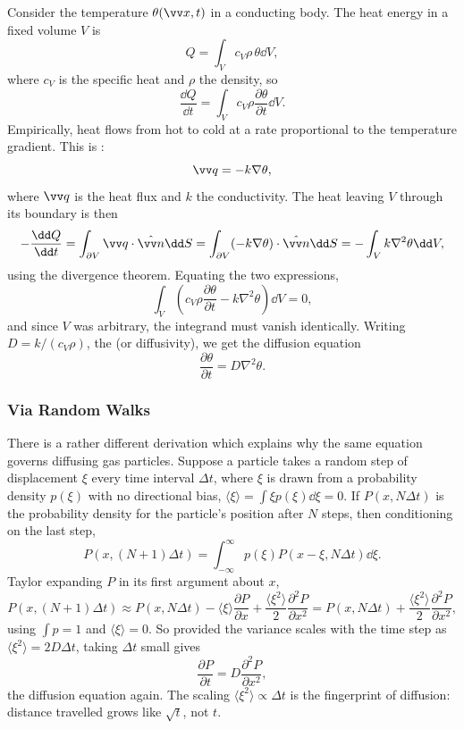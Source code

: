 Consider the temperature $\theta(\vv x, t)$ in a conducting body. The heat energy in a fixed volume $V$ is
$$
Q = \int_V c_V \rho \, \theta \dd V,
$$
where $c_V$ is the specific heat and $\rho$ the density, so
$$
\frac{\dd Q}{\dd t} = \int_V c_V \rho \frac{\partial \theta}{\partial t} \dd V.
$$
Empirically, heat flows from hot to cold at a rate proportional to the temperature gradient. This is :
$$
\vv q = -k \nabla \theta,
$$
where $\vv q$ is the heat flux and $k$ the conductivity. The heat leaving $V$ through its boundary is then
$$
-\frac{\dd Q}{\dd t} = \int_{\partial V} \vv q \cdot \hat{\vv n} \dd S = \int_{\partial V} (-k \nabla \theta) \cdot \hat{\vv n} \dd S = -\int_V k \nabla^2 \theta \dd V,
$$
using the divergence theorem. Equating the two expressions,
$$
\int_V \left(c_V \rho \frac{\partial \theta}{\partial t} - k \nabla^2 \theta \right) \dd V = 0,
$$
and since $V$ was arbitrary, the integrand must vanish identically. Writing $D = k /(c_V \rho)$, the  (or diffusivity), we get the diffusion equation
$$
\frac{\partial \theta}{\partial t} = D \nabla^2 \theta.
$$

\subsubsection*{Via Random Walks}

There is a rather different derivation which explains why the same equation governs diffusing gas particles. Suppose a particle takes a random step of displacement $\xi$ every time interval $\Delta t$, where $\xi$ is drawn from a probability density $p(\xi)$ with no directional bias, $\langle \xi \rangle = \int \xi p(\xi) \dd \xi = 0$.
If $P(x, N \Delta t)$ is the probability density for the particle's position after $N$ steps, then conditioning on the last step,
$$
P(x, (N + 1)\Delta t) = \int_{-\infty}^{\infty} p(\xi) P(x - \xi, N \Delta t) \dd \xi.
$$
Taylor expanding $P$ in its first argument about $x$,
$$
P(x, (N+1)\Delta t) \approx P(x, N \Delta t) - \langle \xi \rangle \frac{\partial P}{\partial x} + \frac{\langle \xi^2 \rangle}{2} \frac{\partial^2 P}{\partial x^2} = P(x, N \Delta t) + \frac{\langle \xi^2 \rangle}{2} \frac{\partial^2 P}{\partial x^2},
$$
using $\int p = 1$ and $\langle \xi \rangle = 0$. So provided the variance scales with the time step as $\langle \xi^2 \rangle = 2 D \Delta t$, taking $\Delta t$ small gives
$$
\frac{\partial P}{\partial t} = D \frac{\partial^2 P}{\partial x^2},
$$
the diffusion equation again. The scaling $\langle \xi^2 \rangle \propto \Delta t$ is the fingerprint of diffusion: distance travelled grows like $\sqrt{t}$, not $t$.

